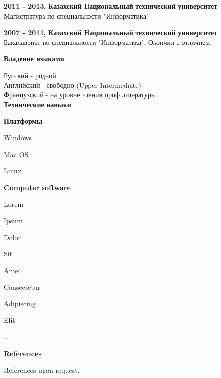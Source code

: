 \documentclass[a4paper,12pt,final]{memoir}
\newcommand{\Sep}{\vspace{1.5em}}
\newcommand{\SmallSep}{\vspace{0.5em}}
\newcommand{\CVSection}[1]
	{\Large\textbf{#1}\par
	\SmallSep\normalsize\normalfont}
\newcommand{\CVItem}[1]
	{\textbf{\color{RoyalBlue} #1}}
\begin{document}
\CVItem{2011 - 2013, Казахский Национальный технический университет}\\
Магистратура по специальности "Информатика"
\SmallSep

\CVItem{2007 - 2011, Казахский Национальный технический университет}\\
Бакалавриат по специальности "Информатика". Окончил с отличием.
\Sep

\CVSection{Владение языками}
Русский - родной\\
Английский - свободно (Upper Intermediate)\\
Французский - на уровне чтения проф.литературы\\


\CVSection{Технические навыки}
\CVItem{Платформы}
\begin{multicols}{3}
\begin{compactitem}[\color{RoyalBlue}$\circ$]
	\item Windows 
	\item Mac OS
	\item Linux
\end{compactitem}
\end{multicols}
\SmallSep

\CVItem{Computer software}
\begin{multicols}{3}
\begin{compactitem}[\color{RoyalBlue}$\circ$]
	\item Lorem 
	\item Ipsum 
	\item Dolor 
	\item Sit 
	\item Amet
	\item Consectetur 
	\item Adipiscing 
	\item Elit
	\item \ldots
\end{compactitem}
\end{multicols}
\Sep 

\CVSection{References}
References upon request.

\end{document}
